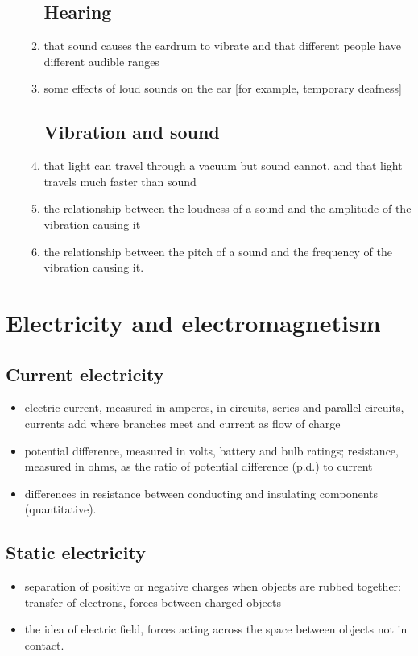 \documentclass[10pt]{article}
\begin{document}
\begin{paracol}{2}
\begin{enumerate}
\begin{enumerate}
\subsection{Hearing}
\item that sound causes the eardrum to vibrate and that different people have
different audible ranges
\item some effects of loud sounds on the ear [for example, temporary deafness]
\subsection{Vibration and sound}
\item that light can travel through a vacuum but sound cannot, and that light
travels much faster than sound
\item the relationship between the loudness of a sound and the amplitude 
of the vibration causing it
\item the relationship between the pitch of a sound and the frequency 
of the vibration causing it.
\end{enumerate}
\end{enumerate}

\switchcolumn*

\section{Electricity and electromagnetism}
\subsection{Current electricity}
\begin{itemize}
\item electric current, measured in amperes, in circuits, series and parallel circuits, currents
add where branches meet and current as flow of charge
\item potential difference, measured in volts, battery and bulb ratings; resistance, measured
in ohms, as the ratio of potential difference (p.d.) to current
\item differences in resistance between conducting and insulating components (quantitative).
\end{itemize}
\subsection{Static electricity}
\begin{itemize}
\item separation of positive or negative charges when objects are rubbed together: transfer
of electrons, forces between charged objects
\item the idea of electric field, forces acting across the space between objects not in contact.
\end{itemize}

\end{paracol}
\end{document}
